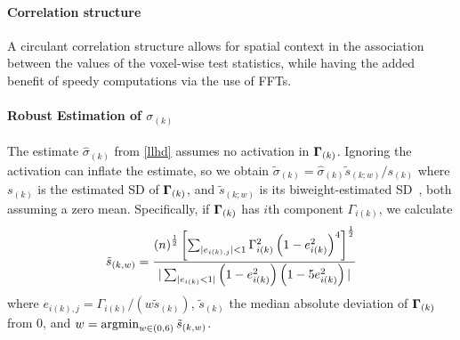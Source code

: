 \begin{enumerate}
\begin{enumerate}
   \paragraph{Correlation structure} A circulant
    correlation structure allows for spatial context in the association
    between the values of the voxel-wise test statistics, while having
    the added benefit of speedy computations via the use of
    FFTs.
    \paragraph{Robust Estimation of $\sigma_{(k)}$} The estimate  
    $\hat\sigma_{(k)}$ from \eqref{llhd} assumes no  activation in
    $\boldsymbol{\Gamma}_{(k)}$. Ignoring the activation can inflate the estimate,
    so we obtain $\tilde\sigma_{(k)}=\hat\sigma_{(k)}\tilde s_{(k;w)}/s_{(k)}$
    where $s_{(k)}$ is the estimated SD of $\boldsymbol{\Gamma}_{(k)}$, and
    $\tilde s_{(k;w)}$ is its biweight-estimated
    SD~\citep{hoaglinetal00}, both assuming a zero mean. Specifically,
    if $\boldsymbol{\Gamma}_{(k)}$ has $i$th component $\Gamma_{i(k)}$, we calculate 
 \begin{equation*}
\tilde s_{(k,w)}=\frac{\left(n\right)^{\frac{1}{2}}\left[\sum_{|e_{i(k),j}|<1}\Gamma_{i(k)}^2\left(1-e_{i(k)}^2\right)^4\right]^\frac{1}{2}}{|\sum_{|e_{i(k)}<1|}\left(1-e_{i(k)}^2\right)\left(1-5e_{i(k)}^2\right)|}
\end{equation*}
where $e_{i(k),j}={\Gamma_{i(k)}}/(w\tilde s_{(k)})$,  $\tilde
s_{(k)}$ the median absolute deviation of $\boldsymbol{\Gamma}_{(k)}$ from 0, and
$w=\operatorname*{argmin}_{w\in(0,6)} \tilde s_{(k,w)}$.   
  

\end{enumerate}
\end{enumerate}
